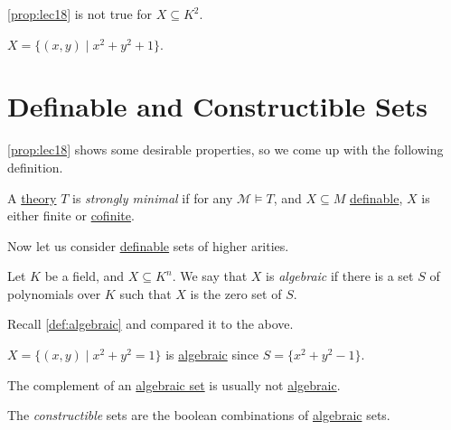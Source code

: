\begin{remark}
	\autoref{prop:lec18} is not true for \(X \subseteq K^2\).
\end{remark}
\begin{explanation}
	\(X = \{ (x, y) \mid x^2 + y^2 + 1 \} \).
\end{explanation}

\section{Definable and Constructible Sets}
\autoref{prop:lec18} shows some desirable properties, so we come up with the following definition.

\begin{definition}\label{def:strongly-minimal}
	A \hyperref[def:theory]{theory} \(T\) is \emph{strongly minimal} if for any \(\mathcal{M} \models T\), and \(X \subseteq M\) \hyperref[def:definable]{definable}, \(X\) is either finite or \hyperref[def:cofinite]{cofinite}.
\end{definition}

Now let us consider \hyperref[def:definable]{definable} sets of higher arities.

\begin{definition}[Algebraic]\label{def:algebraic-set}
	Let \(K\) be a field, and \(X \subseteq K^n\). We say that \(X\) is \emph{algebraic} if there is a set \(S\) of polynomials over \(K\) such that \(X\) is the zero set of \(S\).
\end{definition}

\begin{prev}
	Recall \autoref{def:algebraic} and compared it to the above.
\end{prev}

\begin{eg}
	\(X = \{(x, y) \mid x^2 + y^2 = 1\}\) is \hyperref[def:algebraic]{algebraic} since \(S = \{ x^2 + y^2 -1 \} \).
\end{eg}

The complement of an \hyperref[def:algebraic-set]{algebraic set} is usually not \hyperref[def:algebraic-set]{algebraic}.

\begin{definition}[Constructible]\label{def:constructible}
	The \emph{constructible} sets are the boolean combinations of \hyperref[def:algebraic-set]{algebraic} sets.
\end{definition}

